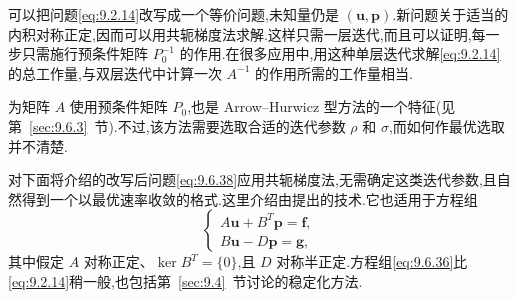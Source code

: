 可以把问题\eqref{eq:9.2.14}改写成一个等价问题,未知量仍是 \((\boldsymbol{u},\boldsymbol{p})\).新问题关于适当的内积对称正定,因而可以用共轭梯度法求解.这样只需一层迭代,而且可以证明,每一步只需施行预条件矩阵 \(P_0^{-1}\) 的作用.在很多应用中,用这种单层迭代求解\eqref{eq:9.2.14}的总工作量,与双层迭代中计算一次 \(A^{-1}\) 的作用所需的工作量相当.

为矩阵 \(A\) 使用预条件矩阵 \(P_0\),也是 Arrow--Hurwicz 型方法的一个特征(见第~\ref{sec:9.6.3}~节).不过,该方法需要选取合适的迭代参数 \(\rho\) 和 \(\sigma\),而如何作最优选取并不清楚.

对下面将介绍的改写后问题\eqref{eq:9.6.38}应用共轭梯度法,无需确定这类迭代参数,且自然得到一个以最优速率收敛的格式.这里介绍由提出的技术.它也适用于方程组
\begin{equation}\label{eq:9.6.36}
  \begin{cases}
    A\boldsymbol{u}+B^T\boldsymbol{p}=\boldsymbol{f},\\
    B\boldsymbol{u}-D\boldsymbol{p}=\boldsymbol{g},
  \end{cases}
\end{equation}
其中假定 \(A\) 对称正定、\(\ker B^T=\{0\}\),且 \(D\) 对称半正定.方程组\eqref{eq:9.6.36}比\eqref{eq:9.2.14}稍一般,也包括第~\ref{sec:9.4}~节讨论的稳定化方法.

